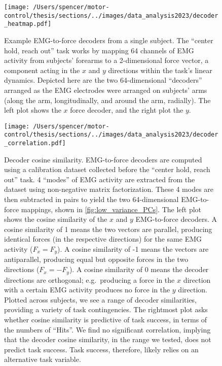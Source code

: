 \documentclass[
  a4paper,
]{article}
\begin{document}
\begin{figure}
\hypertarget{fig:decoders}{%
\centering
\texttt{[image: /Users/spencer/motor-control/thesis/sections/../images/data\_analysis2023/decoder\_heatmap.pdf]}
\caption{Example EMG-to-force decoders from a single subject. The
``center hold, reach out'' task works by mapping 64 channels of EMG
activity from subjects' forearms to a 2-dimensional force vector, a
component acting in the \(x\) and \(y\) directions within the task's
linear dynamics. Depicted here are the two 64-dimensional ``decoders''
arranged as the EMG electrodes were arranged on subjects' arms (along
the arm, longitudinally, and around the arm, radially). The left plot
shows the \(x\) force decoder, and the right plot the
\(y\).}\label{fig:decoders}
}
\end{figure}

\begin{figure}
\hypertarget{fig:decoder_correlations}{%
\centering
\texttt{[image: /Users/spencer/motor-control/thesis/sections/../images/data\_analysis2023/decoder\_correlation.pdf]}
\caption{Decoder cosine similarity. EMG-to-force decoders are computed
using a calibration dataset collected before the ``center hold, reach
out'' task. 4 ``modes'' of EMG activity are extracted from the dataset
using non-negative matrix factorization. These 4 modes are then
subtracted in pairs to yield the two 64-dimensional EMG-to-force
mappings, shown in \cref{fig:low_variance_PCs}. The left plot shows the
cosine similarity of the \(x\) and \(y\) EMG-to-force decoders. A cosine
similarity of 1 means the two vectors are parallel, producing identical
forces (in the respective directions) for the same EMG activity
(\(F_x = F_y\)). A cosine similarity of -1 means the vectors are
antiparallel, producing equal but opposite forces in the two directions
(\(F_x = -F_y\)). A cosine similarity of 0 means the decoder directions
are orthogonal; e.g.~producing a force in the \(x\) direction with a
certain EMG activity produces no force in the \(y\) direction. Plotted
across subjects, we see a range of decoder similarities, providing a
variety of task contingencies. The rightmost plot asks whether cosine
similarity is predictive of task success, in terms of the numbers of
``Hits''. We find no significant correlation, implying that the decoder
cosine similarity, in the range we tested, does not predict task
success. Task success, therefore, likely relies on an alternative task
variable.}\label{fig:decoder_correlations}
}
\end{figure}
\end{document}
